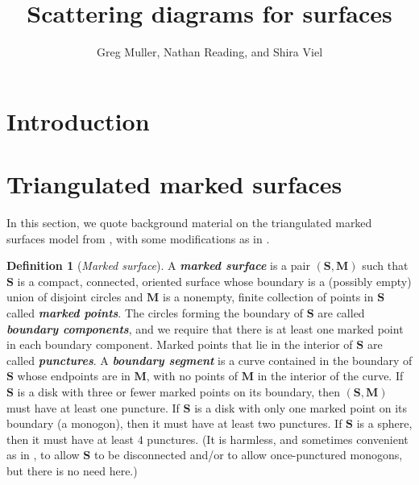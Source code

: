 \documentclass{amsart}
\title{Scattering diagrams for surfaces}
\author{Greg Muller, Nathan Reading, and Shira Viel}
\theoremstyle{definition}
\newtheorem{definition}[proposition]{Definition}
\theoremstyle{remark}
\numberwithin{equation}{section}
\newcommand{\margincolor}{red}
\newcommand{\marginauthorcolor}{darkgreen}
\newcounter{margincounter}
\newcommand{\marginnum}{
\ifnum\value{margincounter}<10
\textcolor{\margincolor}{\begin{picture}(0,0)\put(2.2,2.4){\circle{9}}\end{picture}\footnotesize\arabic{margincounter}}
\else\ifnum\value{margincounter}<100
\textcolor{\margincolor}{\begin{picture}(0,0)\put(4.256,2.5){\circle{11}}\end{picture}\footnotesize\arabic{margincounter}}
\else
\textcolor{\margincolor}{\begin{picture}(0,0)\put(6.8,2.5){\circle{14}}\end{picture}\footnotesize\arabic{margincounter}}
\fi\fi
}
\newcommand{\margin}[2][]
{\!\!\refstepcounter{margincounter}\marginnum\marginpar{\textcolor{\margincolor}{\arabic{margincounter}.}\,\,\tiny #2\,\,\,\textcolor{\marginauthorcolor}{\small#1}}}
\newcommand{\marginN}[1]{\margin[NR]{#1}}
\newcommand{\newword}[1]{\textbf{\emph{#1}}}
\newcommand{\0}{{\mathbf{0}}}
\newcommand{\M}{\mathbf{M}}
\renewcommand{\S}{\mathbf{S}}
\begin{document}
%
%
%

\section{Introduction}\label{intro sec}  




\section{Triangulated marked surfaces}\label{surface sec}
In this section, we quote background material on the triangulated marked surfaces model from \cite{cats1,cats2}, with some modifications as in \cite{unisurface}.


\begin{definition}[\emph{Marked surface}]\label{S M def}
A \newword{marked surface} is a pair $(\S,\M)$ such that $\S$ is a compact, connected, oriented surface whose boundary is a (possibly empty) union of disjoint circles and $\M$ is a nonempty, finite collection of points in $\S$ called \newword{marked points}.
The circles forming the boundary of $\S$ are called \newword{boundary components}, and we require that there is at least one marked point in each boundary component.
Marked points that lie in the interior of $\S$ are called \newword{punctures}.
A \newword{boundary segment} is a curve contained in the boundary of $\S$ whose endpoints are in $\M$, with no points of $\M$ in the interior of the curve.
If $\S$ is a disk with three or fewer marked points on its boundary, then $(\S,\M)$ must have at least one puncture.
If $\S$ is a disk with only one marked point on its boundary (a monogon), then it must have at least two punctures.
If $\S$ is a sphere, then it must have at least $4$ punctures.  
(It is harmless, and sometimes convenient as in \cite{dominance}, to allow $\S$ to be disconnected and/or to allow once-punctured monogons, but there is no need here.)
\end{definition}
\end{document}
